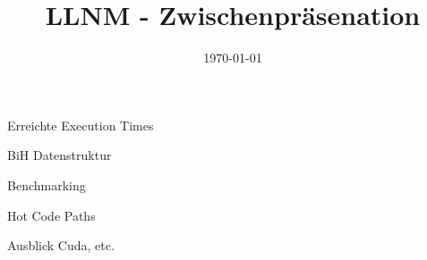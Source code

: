 

\title[LLNM]{LLNM - Zwischenpräsenation}
\subtitle{}
\date{\today}

	\begin{frame}
		\titlepage
	\end{frame}
	\begin{frame}{Erreichte Execution Times}

	\end{frame}
	\begin{frame}{BiH Datenstruktur}

	\end{frame}
	\begin{frame}{Benchmarking}

	\end{frame}
	\begin{frame}{Hot Code Paths}

	\end{frame}
	\begin{frame}{Ausblick}
		Cuda, etc.
	\end{frame}


